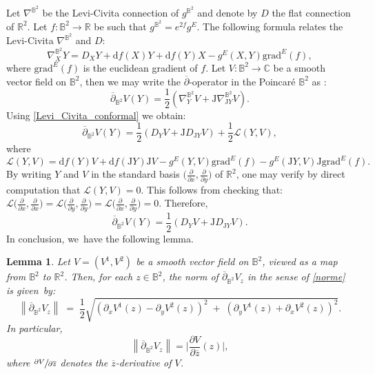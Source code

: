 \documentclass[JEP,XML,SOM,Unicode,NoEqCountersInSection, NoFloatCountersInSection,published]{cedram}
\theoremstyle{plain}
\newtheorem{lemma}[cor]{Lemma}
\theoremstyle{definition}
\newcommand{\J}{\mathrm{J}}
\begin{document}
Let $\nabla^{\mathbb{B}^2}$ be the Levi-Civita connection of $g^{\mathbb{B}^2}$ and denote by $D$ the flat connection of $\mathbb{R}^2$. Let $f:\mathbb{B}^2\to\mathbb{R}$ be such that $g^{\mathbb{B}^2}=e^{2f}g^E$. The following formula relates the Levi-Civita $\nabla^{\mathbb{B}^2}$ and $D$:
\begin{equation}\label{Levi_Civita_conformal}
\nabla^{\mathbb{B}^2}_XY=D_XY+\mathrm{d}f(X)Y+\mathrm{d}f(Y)X-g^E(X,Y)\mathrm{grad}^E(f),
\end{equation}
where $\mathrm{grad}^E(f)$ is the euclidean gradient of $f$. Let $V:\mathbb{B}^2\to\mathbb{C}$ be a smooth vector field on $\mathbb{B}^2$, then we may write the $\overline{\partial}$-operator in the Poincaré $\mathbb{B}^2$ as :
\begin{equation}\label{dbar_B2}
\overline{\partial}_{\mathbb{B}^2}V(Y)=\frac{1}{2}(\nabla^{\mathbb{B}^2}_YV+\J\nabla^{\mathbb{B}^2}_{\J Y}V).
\end{equation}
Using \eqref{Levi_Civita_conformal} we obtain:
\begin{equation}\label{eq_53}
\overline{\partial}_{\mathbb{B}^2}V(Y)=\frac{1}{2} (D_YV+\J D_{\J Y}V)+\frac{1}{2} \mathcal{L}(Y,V),
\end{equation}
where
\[
\mathcal{L}(Y,V)=\mathrm{d}f(Y)V+ \mathrm{d}f(\J Y)\J V-g^{E}(Y,V)\mathrm{grad}^E(f)-g^{E}(\J Y,V)\J\mathrm{grad}^E(f).
\]
By writing \(Y \) and \(V \) in the standard basis \(\bigl(\frac{\partial}{\partial x}, \frac{\partial}{\partial y}\bigr) \) of \(\mathbb{R}^2 \), one may verify by direct computation that \(\mathcal{L}(Y, V) = 0 \). This follows from checking that:
$
\mathcal{L}\bigl(\frac{\partial}{\partial x}, \frac{\partial}{\partial x} \bigr)
= \mathcal{L}\bigl(\frac{\partial}{\partial y}, \frac{\partial}{\partial y} \bigr)
= \mathcal{L}\bigl(\frac{\partial}{\partial x}, \frac{\partial}{\partial y} \bigr)
= 0
$.
Therefore,
\begin{equation}\label{dbar_relation0}
\overline{\partial}_{\mathbb{B}^2}V(Y)=\frac{1}{2}(D_YV + \mathrm{J} D_{\mathrm{J}Y}V).
\end{equation}
In conclusion, we~have the following lemma.

\begin{lemma}\label{same_d_bar}
Let \(V = (V^1, V^2) \) be a smooth vector field on \(\mathbb{B}^2 \), viewed as a map from \(\mathbb{B}^2 \) to \(\mathbb{R}^2 \). Then, for each \(z \!\in\! \mathbb{B}^2 \), the norm of \(\overline{\partial}_{\mathbb{B}^2}V_z \) in the sense of \eqref{norme} is given~by:
\[
\left\lVert\overline\partial_{\mathbb{B}^2}V_z\right\rVert
\;=\;
\frac{1}{2}
\sqrt{
\left(\partial_x V^1(z) - \partial_y V^2(z)\right)^2
\;+\;
\left(\partial_y V^1(z) + \partial_x V^2(z)\right)^2
}.
\]
In particular,
\begin{equation}\label{norme2}
\left\lVert \overline{\partial}_{\mathbb{B}^2} V_z \right\rVert = \biggl| \frac{\partial V}{\partial \overline{z}}(z) \biggr|,
\end{equation}
where \(\sfrac{\partial V}{\partial \overline{z}} \) denotes the \(\overline{z} \)-derivative of \(V \).
\end{lemma}
\end{document}
